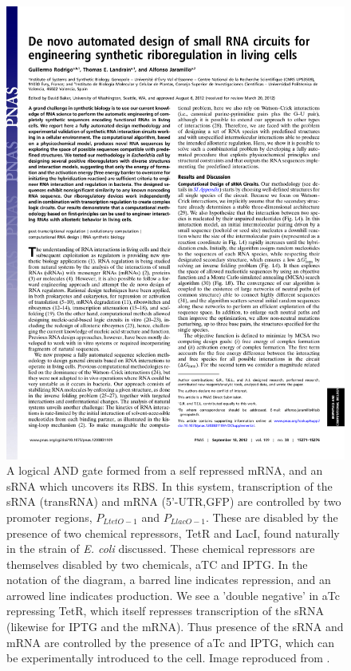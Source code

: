 \documentclass[10pt,journal]{./IEEE_latex_class/IEEEtran}
\begin{document}
\begin{figure}[b!]
\centering
\includegraphics[trim = 30 600 30 0,page=4,clip = true]{pnas1203831109.pdf}
\caption{A logical AND gate formed from a self repressed mRNA, and an sRNA which uncovers its RBS. In this system, transcription of the sRNA (transRNA) and mRNA (5'-UTR,GFP) are controlled by two promoter regions, $P_{LtetO-1}$ and $P_{LlacO-1}$. These are disabled by the presence of two chemical repressors, TetR and LacI, found naturally in the strain of \textit{E. coli} discussed. These chemical repressors are themselves disabled by two chemicals, aTC and IPTG. In the notation of the diagram, a barred line indicates repression, and an arrowed line indicates production. We see a 'double negative' in aTc repressing TetR, which itself represses transcription of the sRNA (likewise for IPTG and the mRNA). Thus presence of the sRNA and mRNA are controlled by the presence of aTc and IPTG, which can be experimentally introduced to the cell.  Image reproduced from \cite{Rodrigo2012}.}
\label{ANDGate}
\end{figure}
\end{document}
